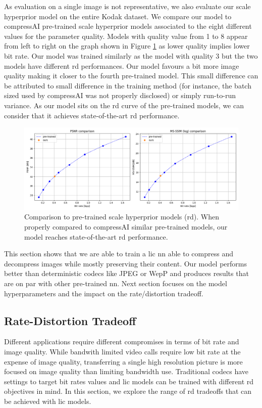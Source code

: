 As evaluation on a single image is not representative, we also evaluate our scale hyperprior model on the entire Kodak dataset. We compare our model to compressAI pre-trained scale hyperprior models associated to the eight different values for the parameter \textsf{quality}. Models with \textsf{quality} value from 1 to 8 appear from left to right on the graph shown in Figure \ref{balle_repro_6} as lower quality implies lower bit rate. Our model was trained similarly as the model with \textsf{quality} 3 but the two models have different \acrshort{rd} performances. Our model favours a bit more image quality making it closer to the fourth pre-trained model. This small difference can be attributed to small difference in the training method (for instance, the batch sized used by compressAI was not properly disclosed) or simply run-to-run variance. As our model sits on the \acrshort{rd} curve of the pre-trained models, we can consider that it achieves state-of-the-art \acrshort{rd} performance. 

\begin{figure}
    \centering
    \includegraphics[width=15cm]{../img/balle_repro_rd_2.png}
    \caption[Comparison to pre-trained scale hyperprior models (\acrshort{rd}).]{Comparison to pre-trained scale hyperprior models (\acrshort{rd}). When properly compared to compressAI similar pre-trained models, our model reaches state-of-the-art \acrshort{rd} performance.}
    \label{balle_repro_6}
\end{figure}

This section shows that we are able to train a \acrshort{lic} \acrshort{nn} able to compress and decompress images while mostly preserving their content. Our model performs better than deterministic codecs like JPEG or WepP and produces results that are on par with other pre-trained \acrshort{nn}. Next section focuses on the model hyperparameters and the impact on the rate/distortion tradeoff.

\subsection{Rate-Distortion Tradeoff}
Different applications require different compromises in terms of bit rate and image quality. While bandwith limited video calls require low bit rate at the expense of image quality, transferring a single high resolution picture is more focused on image quality than limiting bandwidth use. Traditional codecs have settings to target bit rates values and \acrshort{lic} models can be trained with different \acrshort{rd} objectives in mind. In this section, we explore the range of \acrshort{rd} tradeoffs that can be achieved with \acrshort{lic} models.

